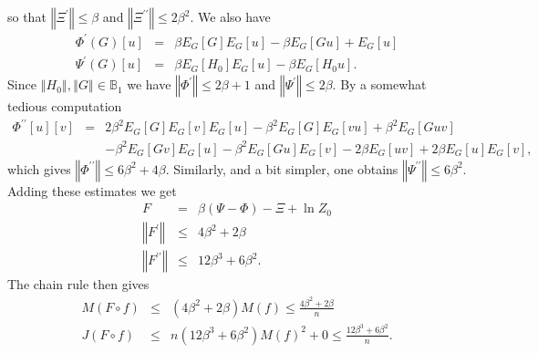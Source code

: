 \documentclass[final,12pt]{colt2018} %
\begin{document}
						so that $\left\Vert \Xi ^{\prime }\right\Vert \leq \beta $ and $\left\Vert
						\Xi ^{\prime \prime }\right\Vert \leq 2\beta ^{2}$. We also have%
						\begin{eqnarray*}
							\Phi ^{\prime }\left( G\right) \left[ u\right]  &=&\beta E_{G}\left[ G\right]
							E_{G}\left[ u\right] -\beta E_{G}\left[ Gu\right] +E_{G}\left[ u\right]  \\
							\Psi ^{\prime }\left( G\right) \left[ u\right]  &=&\beta E_{G}\left[ H_{0}%
							\right] E_{G}\left[ u\right] -\beta E_{G}\left[ H_{0}u\right] .
						\end{eqnarray*}%
						Since $\left\Vert H_{0}\right\Vert ,\left\Vert G\right\Vert \in \mathbb{B}%
						_{1}$ we have $\left\Vert \Phi ^{\prime }\right\Vert \leq 2\beta +1$ and $%
						\left\Vert \Psi ^{\prime }\right\Vert \leq 2\beta $. By a somewhat tedious
						computation%
						\begin{eqnarray*}
							\Phi ^{\prime \prime }\left[ u\right] \left[ v\right]  &=&2\beta ^{2}E_{G}%
							\left[ G\right] E_{G}\left[ v\right] E_{G}\left[ u\right] -\beta ^{2}E_{G}%
							\left[ G\right] E_{G}\left[ vu\right] +\beta ^{2}E_{G}\left[ Guv\right]  \\
							&&-\beta ^{2}E_{G}\left[ Gv\right] E_{G}\left[ u\right] -\beta ^{2}E_{G}%
							\left[ Gu\right] E_{G}\left[ v\right] -2\beta E_{G}\left[ uv\right] +2\beta
							E_{G}\left[ u\right] E_{G}\left[ v\right] ,
						\end{eqnarray*}%
						which gives $\left\Vert \Phi ^{\prime \prime }\right\Vert \leq 6\beta
						^{2}+4\beta $. Similarly, and a bit simpler, one obtains $\left\Vert \Psi
						^{\prime \prime }\right\Vert \leq 6\beta ^{2}$. Adding these estimates we get%
						\begin{eqnarray*}
							F &=&\beta \left( \Psi -\Phi \right) -\Xi +\ln Z_{0} \\
							\left\Vert F^{\prime }\right\Vert  &\leq &4\beta ^{2}+2\beta  \\
							\left\Vert F^{\prime \prime }\right\Vert  &\leq &12\beta ^{3}+6\beta ^{2}.
						\end{eqnarray*}%
						The chain rule then gives%
						\begin{eqnarray*}
							M\left( F\circ f\right)  &\leq &\left( 4\beta ^{2}+2\beta \right) M\left(
							f\right) \leq \frac{4\beta ^{2}+2\beta }{n} \\
							J\left( F\circ f\right)  &\leq &n\left( 12\beta ^{3}+6\beta ^{2}\right)
							M\left( f\right) ^{2}+0\leq \frac{12\beta ^{3}+6\beta ^{2}}{n}.
						\end{eqnarray*}%
						
\end{document}
